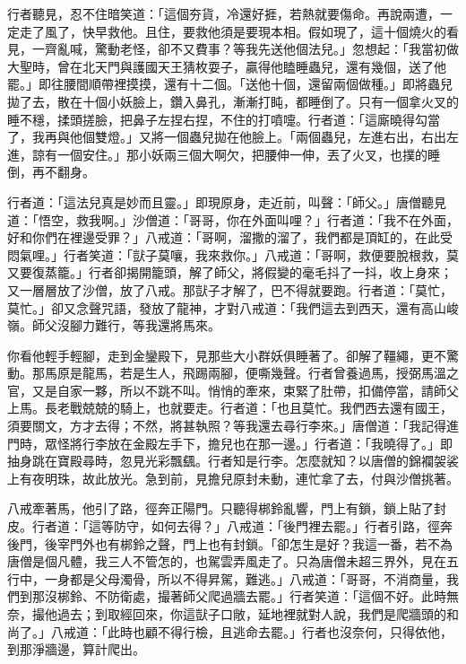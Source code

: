 行者聽見，忍不住暗笑道：「這個夯貨，冷還好捱，若熱就要傷命。再說兩遭，一定走了風了，快早救他。且住，要救他須是要現本相。假如現了，這十個燒火的看見，一齊亂喊，驚動老怪，卻不又費事？等我先送他個法兒。」忽想起：「我當初做大聖時，曾在北天門與護國天王猜枚耍子，贏得他瞌睡蟲兒，還有幾個，送了他罷。」即往腰間順帶裡摸摸，還有十二個。「送他十個，還留兩個做種。」即將蟲兒拋了去，散在十個小妖臉上，鑽入鼻孔，漸漸打盹，都睡倒了。只有一個拿火叉的睡不穩，揉頭搓臉，把鼻子左捏右捏，不住的打噴嚏。行者道：「這廝曉得勾當了，我再與他個雙燈。」又將一個蟲兒拋在他臉上。「兩個蟲兒，左進右出，右出左進，諒有一個安住。」那小妖兩三個大啊欠，把腰伸一伸，丟了火叉，也撲的睡倒，再不翻身。

行者道：「這法兒真是妙而且靈。」即現原身，走近前，叫聲：「師父。」唐僧聽見道：「悟空，救我啊。」沙僧道：「哥哥，你在外面叫哩？」行者道：「我不在外面，好和你們在裡邊受罪？」八戒道：「哥啊，溜撒的溜了，我們都是頂缸的，在此受悶氣哩。」行者笑道：「獃子莫嚷，我來救你。」八戒道：「哥啊，救便要脫根救，莫又要復蒸籠。」行者卻揭開籠頭，解了師父，將假變的毫毛抖了一抖，收上身來；又一層層放了沙僧，放了八戒。那獃子才解了，巴不得就要跑。行者道：「莫忙，莫忙。」卻又念聲咒語，發放了龍神，才對八戒道：「我們這去到西天，還有高山峻嶺。師父沒腳力難行，等我還將馬來。

你看他輕手輕腳，走到金鑾殿下，見那些大小群妖俱睡著了。卻解了韁繩，更不驚動。那馬原是龍馬，若是生人，飛踢兩腳，便嘶幾聲。行者曾養過馬，授弼馬溫之官，又是自家一夥，所以不跳不叫。悄悄的牽來，束緊了肚帶，扣備停當，請師父上馬。長老戰兢兢的騎上，也就要走。行者道：「也且莫忙。我們西去還有國王，須要關文，方才去得；不然，將甚執照？等我還去尋行李來。」唐僧道：「我記得進門時，眾怪將行李放在金殿左手下，擔兒也在那一邊。」行者道：「我曉得了。」即抽身跳在寶殿尋時，忽見光彩飄颻。行者知是行李。怎麼就知？以唐僧的錦襴袈裟上有夜明珠，故此放光。急到前，見擔兒原封未動，連忙拿了去，付與沙僧挑著。

八戒牽著馬，他引了路，徑奔正陽門。只聽得梆鈴亂響，門上有鎖，鎖上貼了封皮。行者道：「這等防守，如何去得？」八戒道：「後門裡去罷。」行者引路，徑奔後門，後宰門外也有梆鈴之聲，門上也有封鎖。「卻怎生是好？我這一番，若不為唐僧是個凡體，我三人不管怎的，也駕雲弄風走了。只為唐僧未超三界外，見在五行中，一身都是父母濁骨，所以不得昇駕，難逃。」八戒道：「哥哥，不消商量，我們到那沒梆鈴、不防衛處，撮著師父爬過牆去罷。」行者笑道：「這個不好。此時無奈，撮他過去；到取經回來，你這獃子口敞，延地裡就對人說，我們是爬牆頭的和尚了。」八戒道：「此時也顧不得行檢，且逃命去罷。」行者也沒奈何，只得依他，到那淨牆邊，算計爬出。

